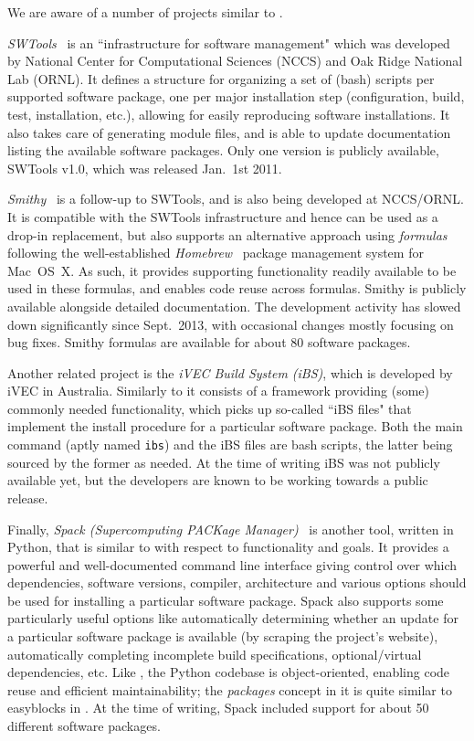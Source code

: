 We are aware of a number of projects similar to \easybuild{}.

\emph{SWTools}~\cite{swtools, jones08} is an ``infrastructure for software
management" which was developed by National Center for Computational Sciences (NCCS)
and Oak Ridge National Lab (ORNL). It defines a structure for organizing a set of
(bash) scripts per supported software package, one per major installation step
(configuration, build, test, installation, etc.), allowing for easily reproducing 
software installations. It also takes care of generating module files, and is
able to update documentation listing the available software packages.
Only one version is publicly available, SWTools v1.0, which was released Jan.~1st 2011.

\emph{Smithy}~\cite{smithy} is a follow-up to SWTools, and is also being developed
at NCCS/ORNL. It is compatible with the SWTools infrastructure and hence can be
used as a drop-in replacement, but also supports an alternative approach using
\emph{formulas} following the well-established \emph{Homebrew}~\cite{homebrew} package
management system for Mac~OS~X. As such, it provides
supporting functionality readily available to be used in these formulas, and enables
code reuse across formulas. Smithy is publicly available alongside detailed
documentation. The development activity has slowed down significantly since
Sept.~2013, with occasional changes mostly focusing on bug fixes.
Smithy formulas are available for about 80 software
packages.

Another related project is the \emph{iVEC Build System (iBS)}, which is developed 
by iVEC in Australia. Similarly to \easybuild{}
it consists of a framework providing (some) commonly needed functionality, which
picks up so-called ``iBS files" that implement the install procedure for a 
particular software package. Both the main command (aptly named
\texttt{\small ibs}) and the iBS files are bash scripts, the latter being sourced by
the former as needed. At the time of writing iBS was not publicly available yet, but
the developers are known to be working towards a public release.

Finally, \emph{Spack (Supercomputing PACKage Manager)}~\cite{spack} is another
tool, written in Python, that is similar to \easybuild{} with respect to functionality and
goals. It provides a powerful and well-documented command line interface giving
control over which dependencies, software versions, compiler, architecture and
various options should be used for installing a particular software package.
Spack also supports some particularly useful options like automatically determining
whether an update for a particular software package is available
(by scraping the project's website), automatically completing
incomplete build specifications, optional/virtual dependencies, etc. Like
\easybuild{}, the Python codebase is object-oriented, enabling code reuse and
efficient maintainability; the \emph{packages} concept in it is quite similar to
easyblocks in \easybuild{}. At the time of writing, Spack included support for about
50 different software packages.

